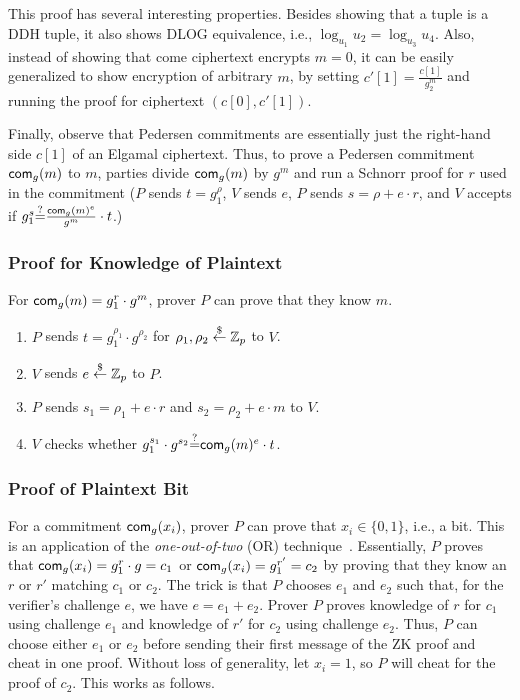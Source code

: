 This proof has several interesting properties. Besides showing that a
tuple is a DDH tuple, it also shows DLOG equivalence, i.e.,
$\log_{u_1}{u_2}=\log_{u_3}{u_4}$. Also, instead of showing that come
ciphertext encrypts $m=0$, it can be easily generalized to show
encryption of arbitrary $m$, by setting $c'[1]=\frac{c[1]}{g_2^m}$ and
running the proof for ciphertext $(c[0],c'[1])$.

Finally, observe that Pedersen commitments are essentially just the
right-hand side $c[1]$ of an Elgamal ciphertext. Thus, to prove a
Pedersen commitment $\mathsf{com}_g(m)$ to $m$, parties divide $\mathsf{com}_g(m)$ by
$g^m$ and run a Schnorr proof for $r$ used in the commitment ($P$
sends $t=g_1^\rho$, $V$ sends $e$, $P$ sends $s=\rho+e\cdot{}r$, and $V$
accepts if $g_1^s{\stackrel{?}{=}}\frac{\mathsf{com}_g(m)^e}{g^m}\cdot{}t$.)


\subsubsection{Proof for Knowledge of Plaintext}
\label{pokop}
For $\mathsf{com}_{g}(m)=g_1^r\cdot{}g^m$,  prover $P$ can prove that they know
$m$.

\begin{enumerate}
\item $P$ sends $t=g_1^{\rho_1}\cdot{}g^{\rho_2}$ for
  $\rho_1,\rho_2\stackrel{\$}{\leftarrow}\mathbb{Z}_p$ to $V$.
\item $V$ sends $e\stackrel{\$}{\leftarrow}\mathbb{Z}_p$ to $P$.
  \item $P$ sends $s_1=\rho_1+e\cdot{}r$ and $s_2=\rho_2+e\cdot{}m$ to
    $V$.
    \item $V$ checks whether $g_1^{s_1}\cdot{}g^{s_2}{\stackrel{?}{=}}\mathsf{com}_{g}(m)^e\cdot{}t$.
\end{enumerate}

\subsubsection{Proof of Plaintext Bit}
\label{pobit}
For a commitment $\mathsf{com}_g(x_i)$, prover $P$ can prove that
$x_i\in\{0,1\}$, i.e., a bit. This is an application of the
\emph{one-out-of-two} (OR) technique~\cite{ooot}. Essentially, $P$
proves that $\mathsf{com}_g(x_i)=g_1^{r}\cdot{}g=c_1$ or
$\mathsf{com}_g(x_i)=g_1^{r'}=c_2$ by proving that they know an $r$ or $r'$
matching $c_1$ or $c_2$. The trick is that $P$ chooses $e_1$ and $e_2$
such that, for the verifier's challenge $e$, we have
$e=e_1+e_2$. Prover $P$ proves knowledge of $r$ for $c_1$ using
challenge $e_1$ and knowledge of $r'$ for $c_2$ using challenge
$e_2$. Thus, $P$ can choose either $e_1$ or $e_2$ before sending their
first message of the ZK proof and cheat in one proof. Without loss of
generality, let $x_i=1$, so $P$ will cheat for the proof of
$c_2$. This works as follows.

